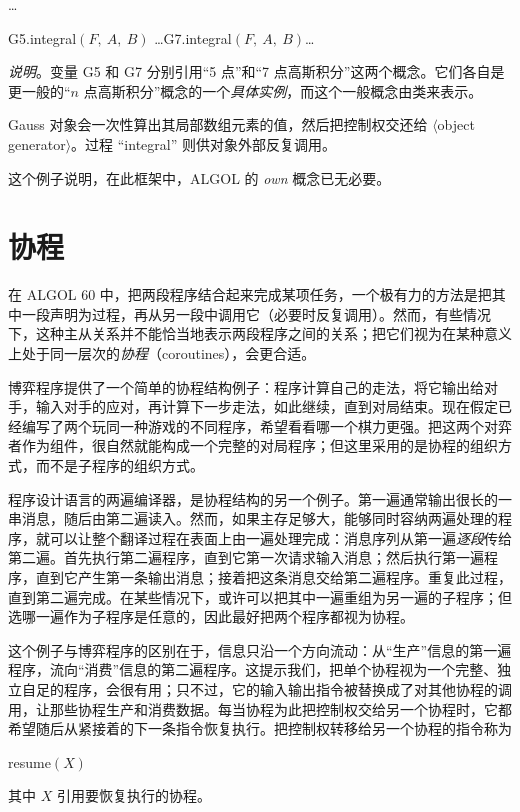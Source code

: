 \documentclass[twoside,11pt,fontset=none]{ctexbook}
\begin{document}
\quad \dots

\quad G5.integral$(F,\ A,\ B)$ \dots G7.integral$(F,\ A,\ B)$\dots

\noindent
\textit{说明}。变量 G5 和 G7 分别引用“5 点”和“7 点高斯积分”这两个概念。它们各自是
更一般的“$n$ 点高斯积分”概念的一个\textit{具体实例}，而这个一般概念由类来表示。

Gauss 对象会一次性算出其局部数组元素的值，然后把控制权交还给 $\langle$object generator$\rangle$。过程 ``integral'' 则供对象外部反复调用。

这个例子说明，在此框架中，ALGOL 的 \textit{own} 概念已无必要。

\section{协程}

在 ALGOL 60 中，把两段程序结合起来完成某项任务，一个极有力的方法是把其中一段声明为过程，再从另一段中调用它（必要时反复调用）。然而，有些情况下，这种主从关系并不能恰当地表示两段程序之间的关系；把它们视为在某种意义上处于同一层次的\textit{协程}（coroutines），会更合适。

博弈程序提供了一个简单的协程结构例子：程序计算自己的走法，将它输出给对手，输入对手的应对，再计算下一步走法，如此继续，直到对局结束。现在假定已经编写了两个玩同一种游戏的不同程序，希望看看哪一个棋力更强。把这两个对弈者作为组件，很自然就能构成一个完整的对局程序；但这里采用的是协程的组织方式，而不是子程序的组织方式。

程序设计语言的两遍编译器，是协程结构的另一个例子。第一遍通常输出很长的一串消息，随后由第二遍读入。然而，如果主存足够大，能够同时容纳两遍处理的程序，就可以让整个翻译过程在表面上由一遍处理完成：消息序列从第一遍\textit{逐段}传给第二遍。首先执行第二遍程序，直到它第一次请求输入消息；然后执行第一遍程序，直到它产生第一条输出消息；接着把这条消息交给第二遍程序。重复此过程，直到第二遍完成。在某些情况下，或许可以把其中一遍重组为另一遍的子程序；但选哪一遍作为子程序是任意的，因此最好把两个程序都视为协程。

这个例子与博弈程序的区别在于，信息只沿一个方向流动：从“生产”信息的第一遍程序，流向“消费”信息的第二遍程序。这提示我们，把单个协程视为一个完整、独立自足的程序，会很有用；只不过，它的输入输出指令被替换成了对其他协程的调用，让那些协程生产和消费数据。每当协程为此把控制权交给另一个协程时，它都希望随后从紧接着的下一条指令恢复执行。把控制权转移给另一个协程的指令称为

\quad resume$(X)$

\noindent
其中 $X$ 引用要恢复执行的协程。
\end{document}
